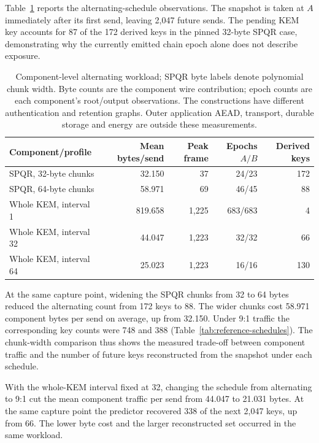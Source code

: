 Table~\ref{tab:reference} reports the alternating-schedule
observations. The snapshot is taken at $A$ immediately after its first send,
leaving 2,047 future sends. The pending KEM key accounts for 87 of the 172
derived keys in the pinned 32-byte SPQR case, demonstrating why the currently
emitted chain epoch alone does not describe exposure.

\begin{table}[t]
\centering
\small
\begin{tabular}{@{}lrrrr@{}}
\toprule
Component/profile & Mean bytes/send & Peak frame & Epochs $A/B$ & Derived keys\\
\midrule
SPQR, 32-byte chunks & 32.150 & 37 & 24/23 & 172\\
SPQR, 64-byte chunks & 58.971 & 69 & 46/45 & 88\\
Whole KEM, interval 1 & 819.658 & 1,225 & 683/683 & 4\\
Whole KEM, interval 32 & 44.047 & 1,223 & 32/32 & 66\\
Whole KEM, interval 64 & 25.023 & 1,223 & 16/16 & 130\\
\bottomrule
\end{tabular}
\caption{Component-level alternating workload; SPQR byte labels denote polynomial chunk width. Byte counts are the
component wire contribution; epoch counts are each component's root/output
observations. The constructions have different authentication and retention
graphs. Outer application AEAD, transport, durable storage and energy are
outside these measurements.}
\label{tab:reference}
\end{table}



At the same capture point, widening the SPQR chunks from 32 to 64 bytes
reduced the alternating count from 172 keys to 88. The wider chunks cost
58.971 component bytes per send on average, up from 32.150. Under 9:1
traffic the corresponding key counts were 748 and 388
(Table~\ref{tab:reference-schedules}). The chunk-width comparison thus
shows the measured trade-off between component traffic and the number of
future keys reconstructed from the snapshot under each schedule.

With the whole-KEM interval fixed at 32, changing the schedule from
alternating to 9:1 cut the mean component traffic per send from 44.047
to 21.031 bytes. At the same capture point the predictor recovered 338
of the next 2,047 keys, up from 66. The lower byte cost and the larger
reconstructed set occurred in the same workload.

